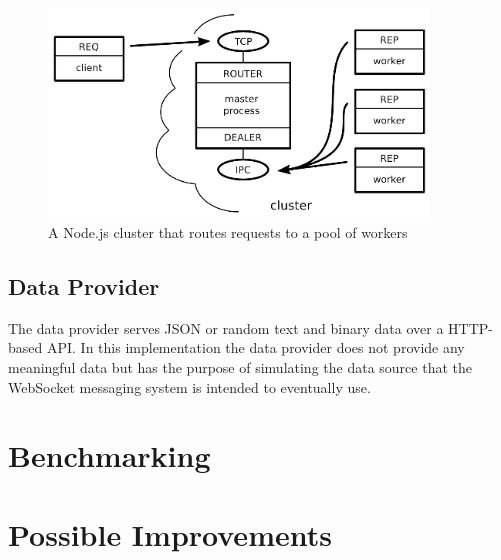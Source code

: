 \begin{figure}[h!]
	\centering
	\label{fig:webSocketMessagingSystem}\includegraphics[width=0.9\textwidth]{images/poolOfWorkers}
	\caption{A Node.js cluster that routes requests to a pool of workers \cite{judd2008node}}
\end{figure}

\subsection{Data Provider}

The data provider serves JSON or random text and binary data over a HTTP-based API. In this implementation the data provider does not provide any meaningful data but has the purpose of simulating the data source that the WebSocket messaging system is intended to eventually use.

\section{Benchmarking}


\section{Possible Improvements}


